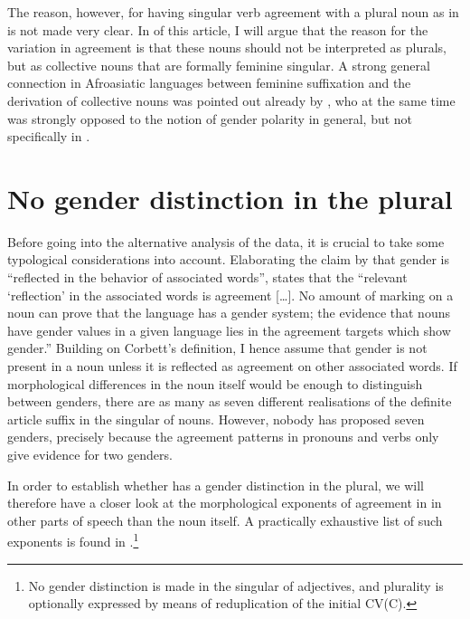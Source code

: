 \documentclass[output=paper]{langsci/langscibook}
\begin{document}
The reason, however, for having singular verb agreement with a plural noun as in  is not made very clear. In  of this article, I will argue that the reason for the variation in agreement is that these nouns should not be interpreted as plurals, but as collective nouns that are formally feminine singular. A strong general connection in Afroasiatic languages between feminine suffixation and the derivation of collective nouns was pointed out already by \citet{Speiser1938}, who at the same time was strongly opposed to the notion of gender polarity in general, but not specifically in .


\section{No gender distinction in the plural}\label{sec:nilsson:2}

Before going into the alternative analysis of the  data, it is crucial to take some typological considerations into account. Elaborating the claim by \citet[231]{Hockett1958} that gender is “reflected in the behavior of associated words”, \citet[89--90]{Corbett2000} states that the “relevant ‘reflection’ in the associated words is agreement […]. No amount of marking on a noun can prove that the language has a gender system; the evidence that nouns have gender values in a given language lies in the agreement targets which show gender.” Building on Corbett’s definition, I hence assume that gender is not present in a noun unless it is reflected as agreement on other associated words. If morphological differences in the noun itself would be enough to distinguish between genders, there are as many as seven different realisations of the definite article suffix in the singular of  nouns. However, nobody has proposed seven genders, precisely because the agreement patterns in pronouns and verbs only give evidence for two genders. 

In order to establish whether  has a gender distinction in the plural, we will therefore have a closer look at the morphological exponents of agreement in  in other parts of speech than the noun itself. A practically exhaustive list of such exponents is found in .\footnote{No gender distinction is made in the singular of adjectives, and plurality is optionally expressed by means of reduplication of the initial CV(C).}
\end{document}
